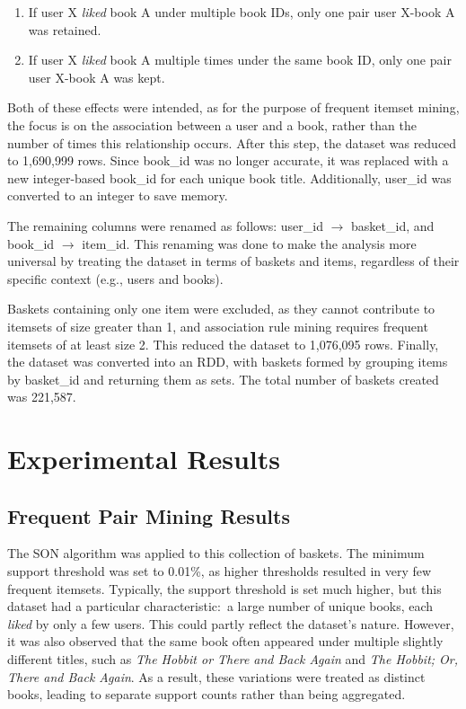 \documentclass{Class/julia}
\begin{document}
\begin{enumerate}
\item If user X \textit{liked} book A under multiple book IDs, only one pair user X-book A was retained.
\item If user X \textit{liked} book A multiple times under the same book ID, only one pair user X-book A was kept.
\end{enumerate}

\noindent Both of these effects were intended, as for the purpose of frequent itemset mining, the focus is on the association between a user and a book, rather than the number of times this relationship occurs. After this step, the dataset was reduced to 1,690,999 rows. Since book\_id was no longer accurate, it was replaced with a new integer-based book\_id for each unique book title. Additionally, user\_id was converted to an integer to save memory.

The remaining columns were renamed as follows: user\_id $\rightarrow$ basket\_id, and book\_id $\rightarrow$ item\_id. This renaming was done to make the analysis more universal by treating the dataset in terms of baskets and items, regardless of their specific context (e.g., users and books).

Baskets containing only one item were excluded, as they cannot contribute to itemsets of size greater than 1, and association rule mining requires frequent itemsets of at least size 2. This reduced the dataset to 1,076,095 rows. Finally, the dataset was converted into an RDD, with baskets formed by grouping items by basket\_id and returning them as sets. The total number of baskets created was 221,587.
 
\section{Experimental Results}\label{sec:4}

\subsection{Frequent Pair Mining Results}

The SON algorithm was applied to this collection of baskets. The minimum support threshold was set to 0.01\%, as higher thresholds resulted in very few frequent itemsets. Typically, the support threshold is set much higher, but this dataset had a particular characteristic:\ a large number of unique books, each \textit{liked} by only a few users. This could partly reflect the dataset's nature. However, it was also observed that the same book often appeared under multiple slightly different titles, such as \textit{The Hobbit or There and Back Again} and \textit{The Hobbit; Or, There and Back Again}. As a result, these variations were treated as distinct books, leading to separate support counts rather than being aggregated.
\end{document}
